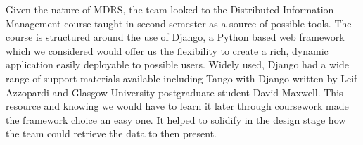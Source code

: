 \documentclass{l3proj}
\begin{document}


Given the nature of MDRS, the team looked to the Distributed Information Management course taught in second semester as a source of possible tools. The course is structured around the use of \gls{Django}, a \gls{Python} based web framework which we considered  would offer us the flexibility to create a rich, dynamic application easily deployable to possible users. Widely used, Django had a wide range of support materials available including Tango with Django\cite{tangoWithDjango} written by Leif Azzopardi and Glasgow University postgraduate student David Maxwell. This resource and knowing we would have to learn it later through coursework made the framework choice an easy one. It helped to solidify in the design stage how the team could retrieve the data to then present.
\end{document}
